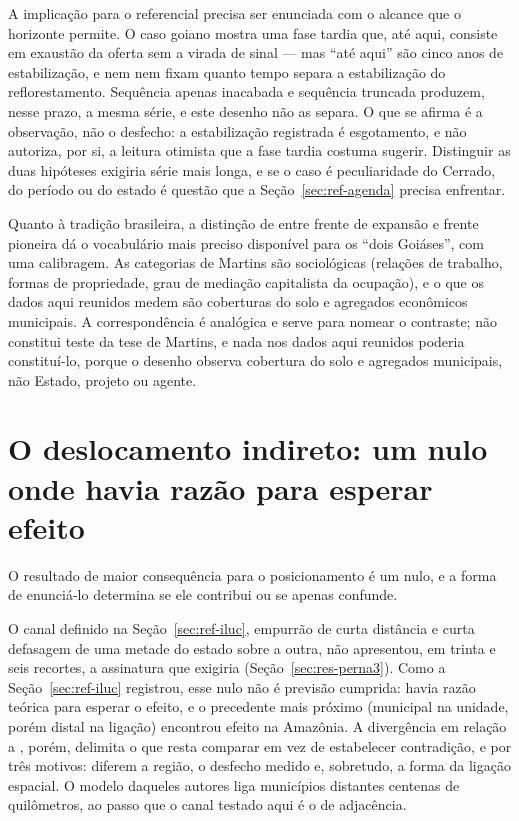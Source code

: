A implicação para o referencial precisa ser enunciada com o alcance que o
horizonte permite. O caso goiano mostra uma fase tardia que, até aqui,
consiste em exaustão da oferta sem a virada de sinal --- mas ``até aqui'' são
cinco anos de estabilização, e nem  nem
 fixam quanto tempo separa a estabilização do
reflorestamento. Sequência apenas inacabada e sequência truncada produzem,
nesse prazo, a mesma série, e este desenho não as separa. O que se afirma é a
observação, não o desfecho: a estabilização registrada é esgotamento, e não
autoriza, por si, a leitura otimista que a fase tardia costuma sugerir.
Distinguir as duas hipóteses exigiria série mais longa, e se o caso é
peculiaridade do Cerrado, do período ou do estado é questão que a
Seção~\ref{sec:ref-agenda} precisa enfrentar.

Quanto à tradição brasileira, a distinção de  entre
frente de expansão e frente pioneira dá o vocabulário mais preciso disponível
para os ``dois Goiáses'', com uma calibragem. As categorias de Martins são
sociológicas (relações de trabalho, formas de propriedade, grau de mediação
capitalista da ocupação), e o que os dados aqui reunidos medem são coberturas
do solo e agregados econômicos municipais. A correspondência é analógica e
serve para nomear o contraste; não constitui teste da tese de Martins, e nada
nos dados aqui reunidos poderia constituí-lo, porque o desenho observa
cobertura do solo e agregados municipais, não Estado, projeto ou agente.

\section{O deslocamento indireto: um nulo onde havia razão para esperar efeito}
\label{sec:disc-iluc}

O resultado de maior consequência para o posicionamento é um nulo, e a forma
de enunciá-lo determina se ele contribui ou se apenas confunde.

O canal definido na Seção~\ref{sec:ref-iluc}, empurrão de curta distância e
curta defasagem de uma metade do estado sobre a outra, não apresentou, em
trinta e seis recortes, a assinatura que exigiria
(Seção~\ref{sec:res-perna3}). Como a Seção~\ref{sec:ref-iluc} registrou, esse
nulo não é previsão cumprida: havia razão teórica para esperar o efeito, e o
precedente mais próximo (municipal na unidade, porém distal na ligação)
encontrou efeito na Amazônia. A divergência em relação a
, porém, delimita o que resta comparar em vez de
estabelecer contradição, e por três motivos: diferem a região, o desfecho
medido e, sobretudo, a forma da ligação espacial. O modelo daqueles
autores liga municípios distantes centenas de quilômetros, ao passo que o
canal testado aqui é o de adjacência.

